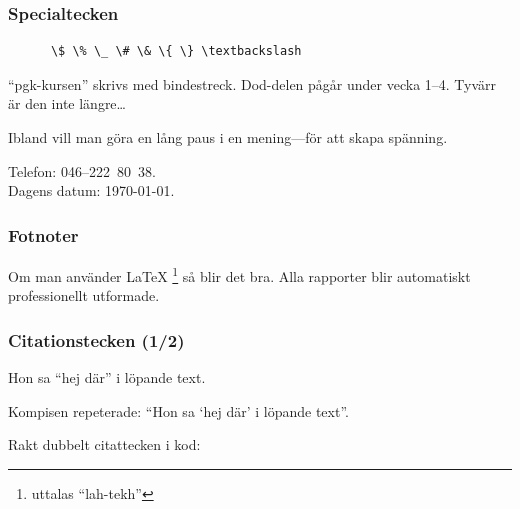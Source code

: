 \begin{frame}[fragile,t]
  \frametitle{Specialtecken}

  \begin{itemize}
  \end{itemize}

    \begin{verbatim}
      \$ \% \_ \# \& \{ \} \textbackslash
    \end{verbatim}

  
  \begin{exlatex}
\enquote{pgk-kursen} skrivs med bindestreck.
Dod-delen pågår under vecka 1--4.
Tyvärr är den inte längre\ldots

Ibland vill man göra en lång paus i en mening---för att skapa spänning.

\quad Telefon: 046--222~80~38.\\
Dagens datum: \today.
  \end{exlatex}
\end{frame}


\begin{frame}[fragile,t]
  \frametitle{Fotnoter}
  \vspace{2em}


  \begin{exlatex}
  Om man använder \LaTeX
  \footnote{uttalas
    \enquote{lah-tekh}} så
  blir det bra. Alla rapporter
  blir automatiskt 
  professionellt
  utformade.
  \end{exlatex}

  \blankline
  \begin{itemize}
  \end{itemize}

\end{frame}

\begin{frame}[fragile,t]
  \frametitle{Citationstecken (1/2)}


\begin{exlatex}
Hon sa \enquote{hej där} i löpande text.

Kompisen repeterade: \enquote{Hon sa \enquote{hej där} i löpande text}.

Rakt dubbelt citattecken i kod: \texttt{\textquotedbl}
\end{exlatex}

\end{frame}


